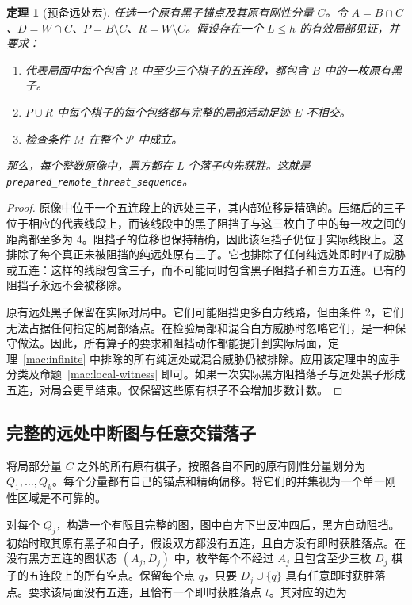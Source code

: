 \documentclass[11pt]{article}
\newtheorem{theorem}{定理}[section]
\theoremstyle{definition}
\theoremstyle{remark}
\begin{document}
\begin{theorem}[预备远处宏]\label{mac:prepared}
任选一个原有黑子锚点及其原有刚性分量 \(C\)。令 \(A=B\cap C\)、\(D=W\cap C\)、\(P=B\setminus C\)、\(R=W\setminus C\)。假设存在一个 \(L\le h\) 的有效局部见证，并要求：

\begin{enumerate}
\item 代表局面中每个包含 \(R\) 中至少三个棋子的五连段，都包含 \(B\) 中的一枚原有黑子。
\item \(P\cup R\) 中每个棋子的每个包络都与完整的局部活动足迹 \(E\) 不相交。
\item 检查条件 \(M\) 在整个 \(\mathcal P\) 中成立。

\end{enumerate}
那么，每个整数原像中，黑方都在 \(L\) 个落子内先获胜。这就是 \texttt{prepared\_\allowbreak remote\_\allowbreak threat\_\allowbreak sequence}。

\end{theorem}
\begin{proof}
原像中位于一个五连段上的远处三子，其内部位移是精确的。压缩后的三子位于相应的代表线段上，而该线段中的黑子阻挡子与这三枚白子中的每一枚之间的距离都至多为 4。阻挡子的位移也保持精确，因此该阻挡子仍位于实际线段上。这排除了每个真正未被阻挡的纯远处原有三子。它也排除了任何纯远处即时四子威胁或五连：这样的线段包含三子，而不可能同时包含黑子阻挡子和白方五连。已有的阻挡子永远不会被移除。

原有远处黑子保留在实际对局中。它们可能阻挡更多白方线路，但由条件 2，它们无法占据任何指定的局部落点。在检验局部和混合白方威胁时忽略它们，是一种保守做法。因此，所有算子的要求和阻挡动作都能提升到实际局面，定理~\ref{mac:infinite} 中排除的所有纯远处或混合威胁仍被排除。应用该定理中的应手分类及命题~\ref{mac:local-witness} 即可。如果一次实际黑方阻挡落子与远处黑子形成五连，对局会更早结束。仅保留这些原有棋子不会增加步数计数。
\end{proof}



\subsection{完整的远处中断图与任意交错落子}\label{mac:interruption-section}

将局部分量 \(C\) 之外的所有原有棋子，按照各自不同的原有刚性分量划分为 \(Q_1,\ldots,Q_k\)。每个分量都有自己的锚点和精确偏移。将它们的并集视为一个单一刚性区域是不可靠的。

对每个 \(Q_j\)，构造一个有限且完整的图，图中白方下出反冲四后，黑方自动阻挡。初始时取其原有黑子和白子，假设双方都没有五连，且白方没有即时获胜落点。在没有黑方五连的图状态 \((A_j,D_j)\) 中，枚举每个不经过 \(A_j\) 且包含至少三枚 \(D_j\) 棋子的五连段上的所有空点。保留每个点 \(q\)，只要 \(D_j\cup\{q\}\) 具有任意即时获胜落点。要求该局面没有五连，且恰有一个即时获胜落点 \(t\)。其对应的边为
\end{document}
